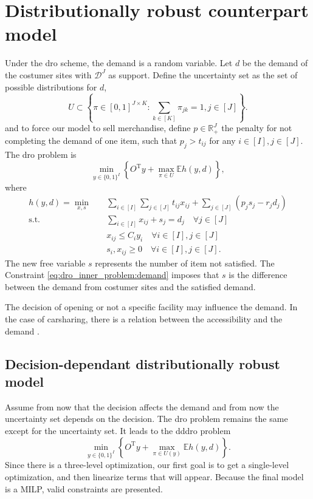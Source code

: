 \documentclass[12pt, letterpaper]{article}
\newcommand{\R}{\mathbb{R}}
\newcommand{\T}{\mathrm{T}}
\newcommand{\E}{\mathbb{E}}
\newcommand{\Dcal}{\mathcal{D}}
\begin{document}
	\section{Distributionally robust counterpart model}
	Under the \gls{dro} scheme, the demand is a random variable. Let $d$ be the demand of the costumer sites with $\Dcal^J$ as support. Define the uncertainty set as the set of possible distributions for $d$,
	\begin{equation} \label{eq:def_uncertainty_set}
		U \subset \left\{\pi \in [0, 1]^{J \times K}: \sum_{k \in [K]} \pi_{jk} = 1, j \in [J]\right\}.
	\end{equation}
	and to force our model to sell merchandise, define $p \in \R_+^J$ the penalty for not completing the demand of one item, such that $p_j > t_{ij}$ for any $i \in [I], j \in [J]$. The \gls{dro} problem is
	\begin{equation}\label{eq:dro_outter_problem}
		\min_{y \in \{0, 1\}^I} \left\{O^\T y + \max_{\pi \in U} \E h(y, d)\right\},
	\end{equation}
	where
	\begin{subequations} \label{eq:dro_inner_problem}
		\begin{align}
			h(y, d) = \min_{x, s} &\quad \sum_{i \in [I]} \sum_{j \in [J]} t_{ij}x_{ij} + \sum_{j \in [J]} (p_j s_j - r_j d_j) \\
			\text{s.t.} &\quad \sum_{i \in [I]} x_{ij} + s_j = d_j \quad \forall j \in [J] \\ \label{eq:dro_inner_problem:demand}
			&\quad x_{ij} \le C_i y_i \quad \forall i \in [I], j \in [J] \\
			&\quad s_i, x_{ij} \ge 0 \quad \forall i \in [I], j \in [J].
		\end{align}
	\end{subequations}
	The new free variable $s$ represents the number of item not satisfied. The Constraint \eqref{eq:dro_inner_problem:demand} imposes that $s$ is the difference between the demand from costumer sites and the satisfied demand.
	
	
	The decision of opening or not a specific facility may influence the demand. In the case of carsharing, there is a relation between the accessibility and the demand \cite{shaheen_carsharing_2006}.
	
	\subsection{Decision-dependant distributionally robust model}
	Assume from now that the decision affects the demand and from now the uncertainty set depends on the decision. The \gls{dro} problem remains the same except for the uncertainty set. It leads to the \gls{dddro} problem 
	\begin{equation}\label{eq:dddro_outter_problem}
		\min_{y \in \{0, 1\}^I} \left\{O^\T y + \max_{\pi \in U(y)} \E h(y, d)\right\}.
	\end{equation}
	Since there is a three-level optimization, our first goal is to get a single-level optimization, and then linearize terms that will appear. Because the final model is a MILP, valid constraints are presented.
	
\end{document}
